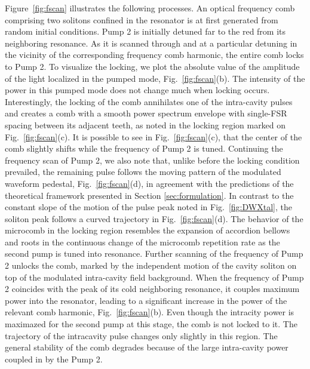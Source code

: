 Figure~\ref{fig:fscan} illustrates the following processes. An optical frequency comb comprising two solitons confined in the resonator is at first generated from random initial conditions. Pump 2 is initially detuned far to the red from its neighboring resonance. As it is scanned through and at a particular detuning in the vicinity of the corresponding frequency comb harmonic, the entire comb locks to Pump 2. To visualize the locking, we plot the absolute value of the amplitude of the light localized in the pumped mode, Fig.~\ref{fig:fscan}(b). The intensity of the power in this pumped mode does not change much when locking occurs. Interestingly, the locking of the comb annihilates one of the intra-cavity pulses and creates a comb with a smooth power spectrum envelope with single-FSR spacing between its adjacent teeth, as noted in the locking region marked on Fig.~\ref{fig:fscan}(c). It is possible to see in Fig.~\ref{fig:fscan}(c), that the center of the comb slightly shifts while the frequency of Pump 2 is tuned. Continuing the frequency scan of Pump 2, we also note that, unlike before the locking condition prevailed, the remaining pulse follows the moving pattern of the modulated waveform pedestal, Fig.~\ref{fig:fscan}(d), in agreement with the predictions of the theoretical framework presented in Section \ref{sec:formulation}. In contrast to the constant slope of the motion of the pulse peak noted in Fig.~\ref{fig:DWXtal}, the soliton peak follows a curved trajectory in Fig.~\ref{fig:fscan}(d). The behavior of the microcomb in the locking region resembles the expansion of accordion bellows and roots in the continuous change of the microcomb repetition rate as the second pump is tuned into resonance. Further scanning of the frequency of Pump 2 unlocks the comb, marked by the independent motion of the cavity soliton on top of the modulated intra-cavity field background. When the frequency of Pump 2 coincides with the peak of its cold neighboring resonance, it couples maximum power into the resonator, leading to a significant increase in the power of the relevant comb harmonic, Fig.~\ref{fig:fscan}(b). Even though the intracity power is maximazed for the second pump at this stage, the comb is not locked to it. The trajectory of the intracavity pulse changes only slightly in this region. The general stability of the comb degrades because of the large intra-cavity power coupled in by the Pump 2.

